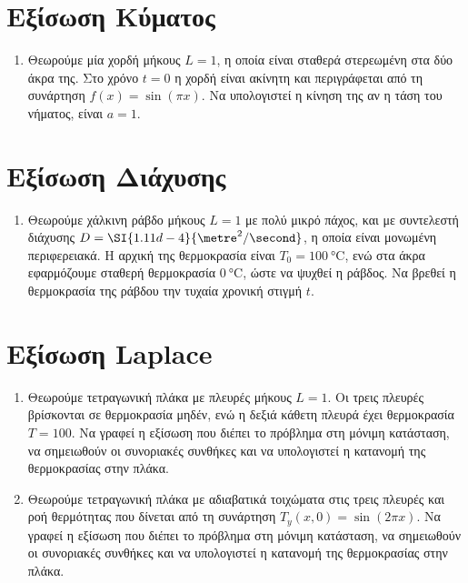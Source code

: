 \documentclass[a4paper,11pt]{report}
\begin{document}
\begin{center}
  \textcolor{Col1}{}
\end{center}


\section*{Εξίσωση Κύματος}%

\begin{enumerate}
  \item Θεωρούμε μία χορδή μήκους $ L=1 $, η οποία είναι σταθερά στερεωμένη στα δύο 
    άκρα της. Στο χρόνο $ t=0 $ η χορδή είναι ακίνητη και περιγράφεται από τη συνάρτηση 
    $ f(x)= \sin{(\pi x)} $. Να υπολογιστεί η κίνηση της αν η τάση του νήματος, είναι 
    $ a = 1 $.
\end{enumerate}


\section*{Εξίσωση Διάχυσης}%

\begin{enumerate}
  \item Θεωρούμε χάλκινη ράβδο μήκους $ L=1 $ με πολύ μικρό πάχος, και με συντελεστή 
    διάχυσης $ D =  \SI{1.11d-4}{\metre^2/\second} $, η οποία είναι μονωμένη 
    περιφερειακά.  Η αρχική της θερμοκρασία είναι $ T_{0} = \SI{100}{\degreeCelsius} $, 
    ενώ στα άκρα εφαρμόζουμε σταθερή θερμοκρασία $ \SI{0}{\degreeCelsius} $, ώστε να 
    ψυχθεί η ράβδος. Να βρεθεί η θερμοκρασία της ράβδου την τυχαία χρονική στιγμή $ t $.
\end{enumerate}


\section*{Εξίσωση Laplace}%

\begin{enumerate}

  \item Θεωρούμε τετραγωνική πλάκα με πλευρές μήκους $ L=1 $. Οι τρεις πλευρές βρίσκονται
    σε θερμοκρασία μηδέν, ενώ η δεξιά κάθετη πλευρά έχει θερμοκρασία $ T=100 $. 
    Να γραφεί η εξίσωση που διέπει το πρόβλημα στη μόνιμη κατάσταση, να σημειωθούν οι 
    συνοριακές συνθήκες και να υπολογιστεί η κατανομή της θερμοκρασίας στην πλάκα.

  \item Θεωρούμε τετραγωνική πλάκα με αδιαβατικά τοιχώματα στις τρεις πλευρές και ροή
    θερμότητας που δίνεται από τη συνάρτηση $ T_{y}(x,0)= \sin{(2 \pi x)} $. 
    Να γραφεί η εξίσωση που διέπει το πρόβλημα στη μόνιμη κατάσταση, να σημειωθούν οι 
    συνοριακές συνθήκες και να υπολογιστεί η κατανομή της θερμοκρασίας στην πλάκα.


\end{enumerate}
\end{document}
